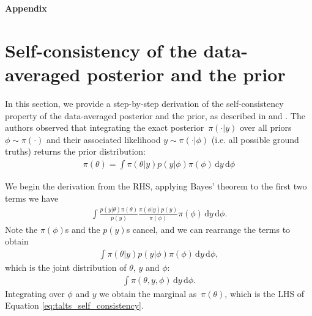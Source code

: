 \documentclass[twoside]{article}
\begin{document}




\vspace{1cm}

{\Large \textbf{Appendix}}
\appendix
\section{Self-consistency of the data-averaged posterior and the prior}

In this section, we provide a step-by-step derivation of the self-consistency property of the data-averaged posterior and the prior, as described in \citep{cook2006validation} and \citep{talts2018validating}.
The authors observed that integrating the exact posterior~$\pi(\cdot|y)$ over all priors $\phi \sim \pi(\cdot)$ and their associated likelihood $y \sim \pi(\cdot | \phi)$ (i.e. all possible ground truths) returns the prior distribution:
\begin{align}
    \pi(\theta) = \int \pi(\theta|y) p(y|\phi) \pi(\phi) \,\textrm{d}y \,\textrm{d}\phi 
    \label{eq:talts_self_consistency}
\end{align}

We begin the derivation from the RHS, applying Bayes' theorem to the first two terms we have
\begin{align}
    \int \frac{p(y|\theta) \pi(\theta)}{p(y)} \frac{\pi(\phi|y) p(y)}{\pi(\phi)} \pi(\phi) \,\textrm{d}y \,\textrm{d}\phi .
\end{align}
Note the $\pi(\phi)$s and the $p(y)$s cancel, and we can rearrange the terms to obtain
\begin{align}
    \int \pi(\theta|y) p(y|\phi) \pi(\phi) \,\textrm{d}y \,\textrm{d}\phi,
\end{align}
which is the joint distribution of $\theta$, $y$ and $\phi$:
\begin{align}
    \int \pi(\theta, y, \phi) \,\textrm{d}y \,\textrm{d}\phi.
\end{align}
Integrating over $\phi$ and $y$ we obtain the marginal as~$\pi(\theta)$, which is the LHS of Equation \eqref{eq:talts_self_consistency}.
\end{document}
